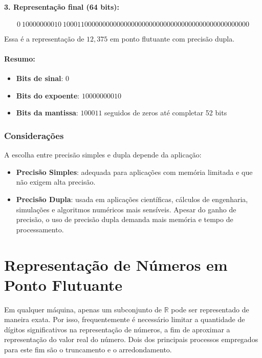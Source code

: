 \paragraph{3. Representação final (64 bits):}

\[
\boxed{
0\ 10000000010\ 1000110000000000000000000000000000000000000000000000
}
\]

\noindent Essa é a representação de \( 12{,}375 \) em ponto flutuante com precisão dupla.

\paragraph{Resumo:}
\begin{itemize}
  \item \textbf{Bits de sinal}: \( 0 \)
  \item \textbf{Bits do expoente}: \( 10000000010 \)
  \item \textbf{Bits da mantissa}: \( 100011 \) seguidos de zeros até completar 52 bits
\end{itemize}


\subsubsection*{Considerações}

A escolha entre precisão simples e dupla depende da aplicação:



\begin{itemize}
  \item \textbf{Precisão Simples}: adequada para aplicações com memória limitada e que não exigem alta precisão.
  \item \textbf{Precisão Dupla}: usada em aplicações científicas, cálculos de engenharia, simulações e algoritmos numéricos mais sensíveis.
Apesar do ganho de precisão, o uso de precisão dupla demanda mais memória e tempo de processamento.


\end{itemize}



\newpage
\section{Representação de Números em Ponto Flutuante}

Em qualquer máquina, apenas um subconjunto de \(\mathbb{R} \) pode ser representado de maneira exata. Por isso, frequentemente é necessário limitar a quantidade de dígitos significativos na representação de números, a fim de aproximar a representação do valor real do número. Dois dos principais processos empregados para este fim são o truncamento e o arredondamento.

